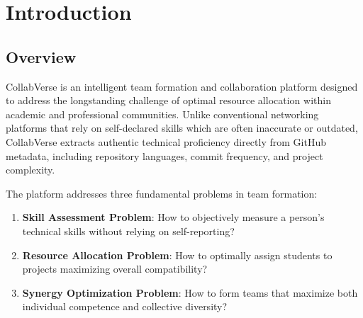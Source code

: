 \documentclass[12pt,a4paper]{article}
\begin{document}
\section{Introduction}

\subsection{Overview}
CollabVerse is an intelligent team formation and collaboration platform designed to address the longstanding challenge of optimal resource allocation within academic and professional communities. Unlike conventional networking platforms that rely on self-declared skills which are often inaccurate or outdated, CollabVerse extracts authentic technical proficiency directly from GitHub metadata, including repository languages, commit frequency, and project complexity.

The platform addresses three fundamental problems in team formation:

\begin{enumerate}
    \item \textbf{Skill Assessment Problem}: How to objectively measure a person's technical skills without relying on self-reporting?
    \item \textbf{Resource Allocation Problem}: How to optimally assign students to projects maximizing overall compatibility?
    \item \textbf{Synergy Optimization Problem}: How to form teams that maximize both individual competence and collective diversity?
\end{enumerate}
\end{document}
